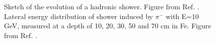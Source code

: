 \begin{figure}[ht]
\centering
{}
\caption{ Sketch of the evolution of a hadronic shower. Figure from Ref. \cite{grupen_shwartz_2008}. 
 Lateral energy distribution of shower induced by $\pi^-$ with E=10 GeV, measured at a depth of 10, 20, 30, 50 and 70 cm in Fe. Figure from Ref. \cite{FRIEND1976505}.}
\label{fig:det:shower_had}
\end{figure}


